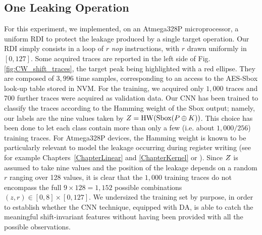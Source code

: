 \subsection{One Leaking Operation}\label{sec:soft}
For this experiment, we implemented, on an Atmega328P microprocessor, a uniform RDI \cite{tunstall2007efficient} to protect the leakage produced by a single target operation. Our RDI simply consists in a loop of  $r$ \emph{nop} instructions, with $r$  drawn uniformly in $[0,127]$. Some acquired traces are reported in the left side of Fig. \ref{fig:CW_shift_traces}, the target peak being highlighted with a red ellipse. They are composed of $3,996$ time samples, corresponding to an access to the AES-Sbox look-up table stored in NVM. For the training, we acquired only $1,000$ traces and 700 further traces were acquired as validation data. Our CNN has been trained to classify the traces according to the Hamming weight of the Sbox output; namely, our labels are the nine values taken by $Z = \mathrm{HW}(\mathrm{Sbox}(P\oplus K))$. This choice has been done to let each class contain more than only a few (i.e. about $1,000/256$) training traces.
For Atmega328P devices, the Hamming weight is known to be particularly relevant to model the leakage occurring during register writing (see for example Chapters~\ref{ChapterLinear} and \ref{ChapterKernel} or \cite{BelaidCFGKP15}). Since $Z$ is assumed to take nine values and the position of the leakage depends on a random $r$ ranging over 128 values, it is clear that the $1,000$ training traces do not encompass the full $9 \times 128=1,152$ possible combinations $(z,r)\in [0,8]\times[0,127]$. We undersized the training set by purpose, in order to establish whether the CNN technique, equipped with DA, is able to catch the meaningful shift-invariant features without having been provided with all the possible observations.\\


